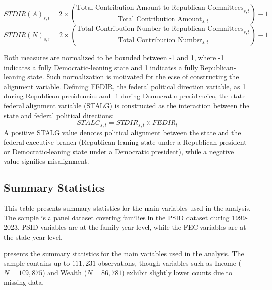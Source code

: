 $$
STDIR(A)_{s,t} = 2 \times \left( \frac{\text{Total Contribution Amount to Republican Committees}_{s,t}}{\text{Total Contribution Amount}_{s,t}} \right) - 1
$$
$$
STDIR(N)_{s,t} = 2 \times \left( \frac{\text{Total Contribution Number to Republican Committees}_{s,t}}{\text{Total Contribution Number}_{s,t}} \right) - 1
$$

Both measures are normalized to be bounded between -1 and 1, where -1 indicates a fully Democratic-leaning state and 1 indicates a fully Republican-leaning state. Such normalization is motivated for the ease of constructing the alignment variable. Defining FEDIR, the federal political direction variable, as 1 during Republican presidencies and -1 during Democratic presidencies, the state-federal alignment variable (STALG) is constructed as the interaction between the state and federal political directions:
$$
STALG_{s,t} = STDIR_{s,t} \times FEDIR_t
$$
A positive STALG value denotes political alignment between the state and the federal executive branch (Republican-leaning state under a Republican president or Democratic-leaning state under a Democratic president), while a negative value signifies misalignment.

\subsection{Summary Statistics}
\label{sec:summary_stats}

\begin{table}[htbp]
    \caption{Summary Statistics}
    \label{tab:1}

    \begin{minipage}{\textwidth}
        \small This table presents summary statistics for the main variables used in the analysis. The sample is a panel dataset covering families in the PSID dataset during 1999-2023. PSID variables are at the family-year level, while the FEC variables are at the state-year level.
    \end{minipage}

    \vspace{1ex}

    \small 

    
\end{table}

 presents the summary statistics for the main variables used in the analysis. The sample contains up to $111,231$ observations, though variables such as Income ($N=109,875$) and Wealth ($N=86,781$) exhibit slightly lower counts due to missing data. 

